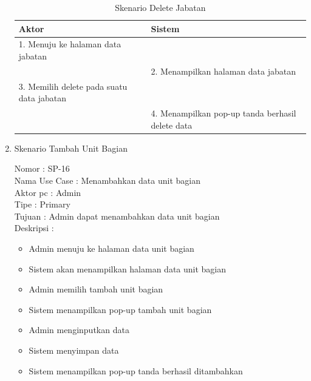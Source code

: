 \begin{enumerate}
\begin{itemize}
\end{itemize}

\begin{table}
	\caption{Skenario Delete Jabatan}
	\centering
	\begin{tabular}{ | p{55mm} | p{70mm}|}
		\hline 
		\textbf{Aktor} & \textbf{Sistem} \\
		\hline
		
		1.	Menuju ke halaman data jabatan &  \\
		
		\hline
		
		&  2.	Menampilkan halaman data jabatan \\
		
		\hline
		
		3. Memilih delete pada suatu data jabatan & \\
		
		\hline
		
		& 4.	Menampilkan pop-up tanda berhasil delete data \\
		\hline
		
	\end{tabular}
\end{table}

\item Skenario Tambah Unit Bagian

Nomor \kern 3.6pc : SP-16 \\
Nama Use Case : Menambahkan data unit bagian \\
Aktor  pc : Admin \\
Tipe \kern 4.6pc : Primary \\
Tujuan \kern 3.6pc : Admin dapat menambahkan data unit bagian \\
Deskripsi \kern 2.5pc : 

\begin{itemize}
	\item Admin menuju ke halaman data unit bagian
	\item Sistem akan menampilkan halaman data unit bagian
	\item Admin memilih tambah unit bagian
	\item Sistem menampilkan pop-up tambah unit bagian
	\item Admin menginputkan data
	\item Sistem menyimpan data
	\item Sistem menampilkan pop-up tanda berhasil ditambahkan
	
\end{itemize}


\end{enumerate}
